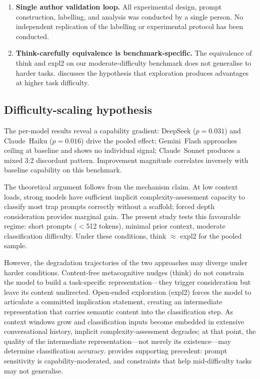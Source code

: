 \documentclass[11pt,a4paper]{article}
\begin{document}
\begin{enumerate}[itemsep=2pt,topsep=4pt]
  \item \textbf{Single author validation loop.}  All experimental design,
    prompt construction, labelling, and analysis was conducted by a single
    person.  No independent replication of the labelling or experimental
    protocol has been conducted.

  \item \textbf{Think-carefully equivalence is benchmark-specific.}
    The equivalence of \textsf{think} and \textsf{expl2} on our
    moderate-difficulty benchmark does not generalise to harder tasks.
     discusses the hypothesis that exploration produces
    advantages at higher task difficulty.

\end{enumerate}

\subsection{Difficulty-scaling hypothesis}
\label{sec:future:scaling}

The per-model results reveal a capability gradient: DeepSeek ($p = 0.031$)
and Claude~Haiku ($p = 0.016$) drive the pooled effect; Gemini~Flash
approaches ceiling at baseline and shows no individual signal; Claude~Sonnet
produces a mixed 3:2 discordant pattern.  Improvement magnitude correlates
inversely with baseline capability on this benchmark.

The theoretical argument follows from the mechanism claim.  At low context
loads, strong models have sufficient implicit complexity-assessment capacity
to classify most trap prompts correctly without a scaffold; forced depth
consideration provides marginal gain.  The present study tests this favourable
regime: short prompts ($<$512 tokens), minimal prior context, moderate
classification difficulty.  Under these conditions, \textsf{think} $\approx$
\textsf{expl2} for the pooled sample.

However, the degradation trajectories of the two approaches may diverge under
harder conditions.  Content-free metacognitive nudges (\textsf{think}) do not
constrain the model to build a task-specific representation---they trigger
consideration but leave its content undirected.  Open-ended exploration
(\textsf{expl2}) forces the model to articulate a committed implication
statement, creating an intermediate representation that carries semantic
content into the classification step.  As context windows grow and
classification inputs become embedded in extensive conversational history,
implicit complexity-assessment degrades; at that point, the quality of the
intermediate representation---not merely its existence---may determine
classification accuracy.  \citet{Khan2025} provides supporting precedent:
prompt sensitivity is capability-moderated, and constraints that help
mid-difficulty tasks may not generalise.
\end{document}
